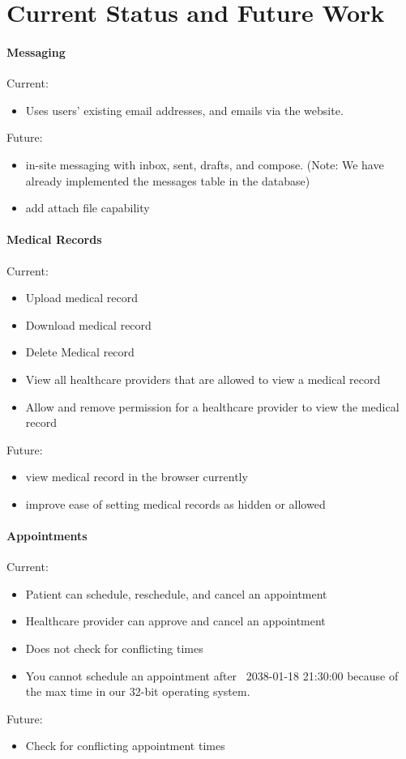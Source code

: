 \documentclass[10pt]{report}
\begin{document}
\chapter{Current Status and Future Work}

\subsubsection{Messaging}
Current: 
\begin{itemize}
\item Uses users' existing email addresses, and emails via the website. 
\end{itemize}
Future: 
\begin{itemize}
\item in-site messaging with inbox, sent, drafts, and compose. (Note: We have already implemented the messages table in the database)
\item add attach file capability
\end{itemize}

\subsubsection{Medical Records}

Current: 
\begin{itemize}
\item Upload medical record
\item Download medical record
\item Delete Medical record
\item View all healthcare providers that are allowed to view a medical record
\item Allow and remove permission for a healthcare provider to view the medical record
\end{itemize}
Future:
\begin{itemize}
\item view medical record in the browser currently 
\item improve ease of setting medical records as hidden or allowed
\end{itemize}

\subsubsection{Appointments}
Current: 
\begin{itemize}
\item Patient can schedule, reschedule, and cancel an appointment
\item Healthcare provider can approve and cancel an appointment
\item Does not check for conflicting times 
\item You cannot schedule an appointment after ~2038-01-18 21:30:00 because of the max time in our 32-bit operating system. 
\end{itemize}
Future: 
\begin{itemize}
\item Check for conflicting appointment times
\end{itemize}
\end{document}
